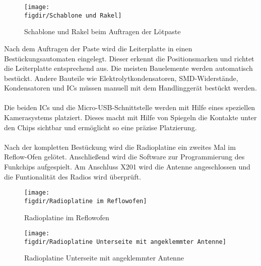 \begin{figure}[h!]
    \centering
    \texttt{[image: \\figdir/Schablone und Rakel]}
    \caption{Schablone und Rakel beim Auftragen der Lötpaste}
    \label{fig:fig: Abbildung 15}
\end{figure}

\noindent
Nach dem Auftragen der Paste wird die Leiterplatte in einen Bestückungsautomaten eingelegt.
Dieser erkennt die Positionsmarken und richtet die Leiterplatte entsprechend aus. Die meisten Bauelemente werden automatisch bestückt. Andere Bauteile wie Elektrolytkondensatoren, SMD-Widerstände, Kondensatoren und ICs müssen manuell mit dem Handlinggerät bestückt werden.\\
\\
Die beiden ICs und die Micro-USB-Schnittstelle werden mit Hilfe eines speziellen Kamerasystems platziert.
Dieses macht mit Hilfe von Spiegeln die Kontakte unter den Chips sichtbar und ermöglicht so eine präzise Platzierung.\\
\\
Nach der kompletten Bestückung wird die Radioplatine ein zweites Mal im Reflow-Ofen gelötet.
Anschließend wird die Software zur Programmierung des Funkchips aufgespielt.
Am Anschluss X201 wird die Antenne angeschlossen und die Funtionalität des Radios wird überprüft.

\begin{figure}[h!]
    \centering
    \texttt{[image: \\figdir/Radioplatine im Reflowofen]}
    \caption{Radioplatine im Reflowofen}
    \label{fig:fig: Abbildung 16}
\end{figure}

\begin{figure}[h!]
    \centering
    \texttt{[image: \\figdir/Radioplatine Unterseite mit angeklemmter Antenne]}
    \caption{Radioplatine Unterseite mit angeklemmter Antenne}
    \label{fig:fig: Abbildung 17}
\end{figure}


